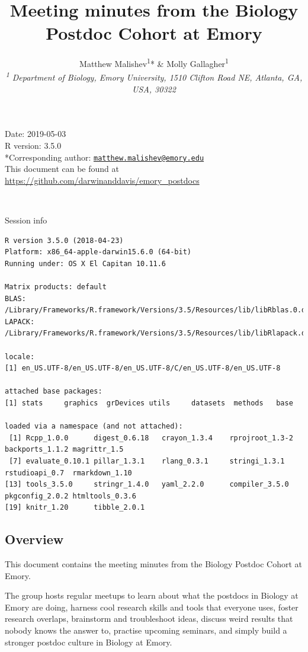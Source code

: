 \documentclass[10,portrait]{article}
\title{Meeting minutes from the Biology Postdoc Cohort at Emory}
\author{Matthew Malishev\textsuperscript{1}* \& Molly
Gallagher\textsuperscript{1}\\[2\baselineskip]\emph{\textsuperscript{1}
Department of Biology, Emory University, 1510 Clifton Road NE, Atlanta,
GA, USA, 30322}}
\date{}
\begin{document}
\maketitle

{
\hypersetup{linkcolor=black}
\setcounter{tocdepth}{2}
\tableofcontents
}
\newpage   

Date: 2019-05-03\\
R version: 3.5.0\\
*Corresponding author:
\href{mailto:matthew.malishev@emory.edu}{\nolinkurl{matthew.malishev@emory.edu}}\\
This document can be found at
\url{https://github.com/darwinanddavis/emory_postdocs}

~

Session info

\begin{verbatim}
R version 3.5.0 (2018-04-23)
Platform: x86_64-apple-darwin15.6.0 (64-bit)
Running under: OS X El Capitan 10.11.6

Matrix products: default
BLAS: /Library/Frameworks/R.framework/Versions/3.5/Resources/lib/libRblas.0.dylib
LAPACK: /Library/Frameworks/R.framework/Versions/3.5/Resources/lib/libRlapack.dylib

locale:
[1] en_US.UTF-8/en_US.UTF-8/en_US.UTF-8/C/en_US.UTF-8/en_US.UTF-8

attached base packages:
[1] stats     graphics  grDevices utils     datasets  methods   base     

loaded via a namespace (and not attached):
 [1] Rcpp_1.0.0      digest_0.6.18   crayon_1.3.4    rprojroot_1.3-2 backports_1.1.2 magrittr_1.5   
 [7] evaluate_0.10.1 pillar_1.3.1    rlang_0.3.1     stringi_1.3.1   rstudioapi_0.7  rmarkdown_1.10 
[13] tools_3.5.0     stringr_1.4.0   yaml_2.2.0      compiler_3.5.0  pkgconfig_2.0.2 htmltools_0.3.6
[19] knitr_1.20      tibble_2.0.1   
\end{verbatim}

\newpage  

\subsection{Overview}\label{overview}

This document contains the meeting minutes from the Biology Postdoc
Cohort at Emory.

The group hosts regular meetups to learn about what the postdocs in
Biology at Emory are doing, harness cool research skills and tools that
everyone uses, foster research overlaps, brainstorm and troubleshoot
ideas, discuss weird results that nobody knows the answer to, practise
upcoming seminars, and simply build a stronger postdoc culture in
Biology at Emory.
\end{document}
